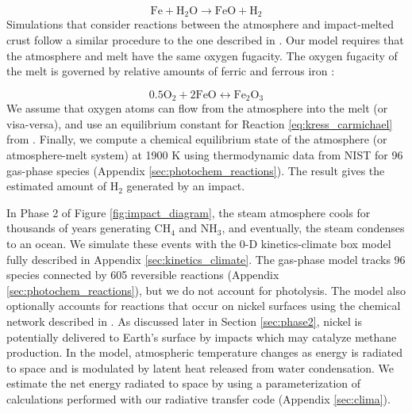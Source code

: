 \begin{equation}
  \mathrm{Fe} + \mathrm{H_2O} \rightarrow \mathrm{FeO} + \mathrm{H_2}
\end{equation}
Simulations that consider reactions between the atmosphere and impact-melted crust follow a similar procedure to the one described in \citet{Itcovitz_2022}. Our model requires that the atmosphere and melt have the same oxygen fugacity. The oxygen fugacity of the melt is governed by relative amounts of ferric and ferrous iron \citep{Kress_1991}:

\begin{equation} 
  \label{eq:kress_carmichael}
  0.5 \mathrm{O_2} + 2 \mathrm{FeO} \leftrightarrow \mathrm{Fe_2O_3}
\end{equation}
We assume that oxygen atoms can flow from the atmosphere into the melt (or visa-versa), and use an equilibrium constant for Reaction \ref{eq:kress_carmichael} from \citet{Kress_1991}. Finally, we compute a chemical equilibrium state of the atmosphere (or atmosphere-melt system) at 1900 K using thermodynamic data from NIST for 96 gas-phase species (Appendix \ref{sec:photochem_reactions}). The result gives the estimated amount of H$_2$ generated by an impact.

In Phase 2 of Figure \ref{fig:impact_diagram}, the steam atmosphere cools for thousands of years generating CH$_4$ and NH$_3$, and eventually, the steam condenses to an ocean. We simulate these events with the 0-D kinetics-climate box model fully described in Appendix \ref{sec:kinetics_climate}. The gas-phase model tracks 96 species connected by 605 reversible reactions (Appendix \ref{sec:photochem_reactions}), but we do not account for photolysis. The model also optionally accounts for reactions that occur on nickel surfaces using the chemical network described in \citet{Schmider_2021}. As discussed later in Section \ref{sec:phase2}, nickel is potentially delivered to Earth's surface by impacts which may catalyze methane production. In the model, atmospheric temperature changes as energy is radiated to space and is modulated by latent heat released from water condensation. We estimate the net energy radiated to space by using a parameterization of calculations performed with our radiative transfer code (Appendix \ref{sec:clima}).

